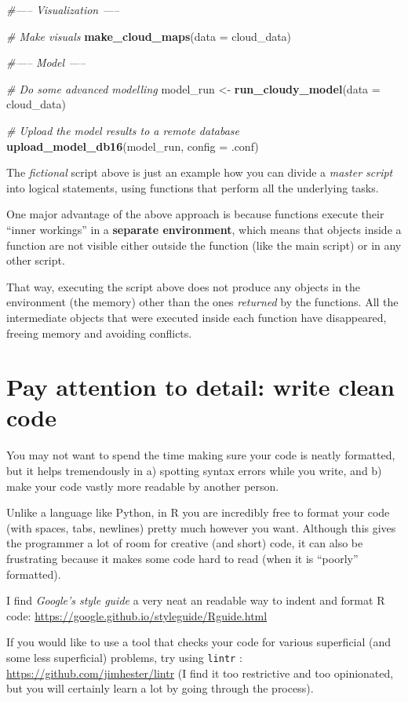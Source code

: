 \documentclass[]{book}
\newenvironment{Shaded}{\begin{snugshade}}{\end{snugshade}}
\newcommand{\CommentTok}[1]{\textcolor[rgb]{0.56,0.35,0.01}{\textit{#1}}}
\newcommand{\DataTypeTok}[1]{\textcolor[rgb]{0.13,0.29,0.53}{#1}}
\newcommand{\KeywordTok}[1]{\textcolor[rgb]{0.13,0.29,0.53}{\textbf{#1}}}
\newcommand{\NormalTok}[1]{#1}
\newcommand{\StringTok}[1]{\textcolor[rgb]{0.31,0.60,0.02}{#1}}
\let\BeginKnitrBlock\begin \let\EndKnitrBlock\end
\begin{document}
\begin{Shaded}
\begin{Highlighting}[]
\CommentTok{#----- Visualization -----}

\CommentTok{# Make visuals}
\KeywordTok{make_cloud_maps}\NormalTok{(}\DataTypeTok{data =}\NormalTok{ cloud_data)}

\CommentTok{#----- Model -----}

\CommentTok{# Do some advanced modelling}
\NormalTok{model_run <-}\StringTok{ }\KeywordTok{run_cloudy_model}\NormalTok{(}\DataTypeTok{data =}\NormalTok{ cloud_data)}

\CommentTok{# Upload the model results to a remote database}
\KeywordTok{upload_model_db16}\NormalTok{(model_run, }\DataTypeTok{config =}\NormalTok{ .conf)}
\end{Highlighting}
\end{Shaded}

The \emph{fictional} script above is just an example how you can divide a \emph{master script} into logical statements, using functions that perform all the underlying tasks.

One major advantage of the above approach is because functions execute their ``inner workings'' in a \textbf{separate environment}, which means that objects inside a function are not visible either outside the function (like the main script) or in any other script.

That way, executing the script above does not produce any objects in the environment (the memory) other than the ones \emph{returned} by the functions. All the intermediate objects that were executed inside each function have disappeared, freeing memory and avoiding conflicts.

\hypertarget{pay-attention-to-detail-write-clean-code}{%
\section{Pay attention to detail: write clean code}\label{pay-attention-to-detail-write-clean-code}}

You may not want to spend the time making sure your code is neatly formatted, but it helps tremendously in a) spotting syntax errors while you write, and b) make your code vastly more readable by another person.

Unlike a language like Python, in R you are incredibly free to format your code (with spaces, tabs, newlines) pretty much however you want. Although this gives the programmer a lot of room for creative (and short) code, it can also be frustrating because it makes some code hard to read (when it is ``poorly'' formatted).

\BeginKnitrBlock{rmdreading}
I find \emph{Google's style guide} a very neat an readable way to indent and format R code: \url{https://google.github.io/styleguide/Rguide.html}
\EndKnitrBlock{rmdreading}

\BeginKnitrBlock{rmdtry}
If you would like to use a tool that checks your code for various superficial (and some less superficial) problems, try using \texttt{lintr} : \url{https://github.com/jimhester/lintr} (I find it too restrictive and too opinionated, but you will certainly learn a lot by going through the process).
\EndKnitrBlock{rmdtry}


\end{document}
